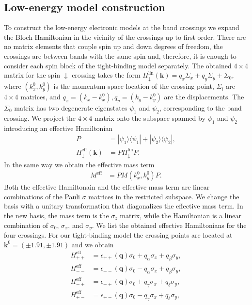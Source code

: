 \documentclass[aps,preprintnumbers,amsmath,amssymb]{revtex4-2}
\begin{document}
\subsection{Low-energy model construction}\label{appendix_lowEn}
To construct the low-energy electronic models at the band crossings we expand the Bloch Hamiltonian in the vicinity of the crossings up to first order. 
There are no matrix elements that couple spin up and down degrees of freedom, the crossings are between bands with the same spin and, therefore, it is enough to consider each spin block of the tight-binding model separately. The obtained $4 \times 4$ matrix for the spin $\downarrow$ crossing takes the form $H_{\downarrow}^{\text{lin}}(\mathbf{k}) = q_x \Sigma_x+q_y\Sigma_y +\Sigma_0$, where $(k_x^0, k_y^0)$ is the momentum-space location of the crossing point, $ \Sigma_i$ are $4 \times 4$ matrices, and $q_x = (k_x-k_{x}^0), q_y = (k_y-k_{y}^0)$ are the displacements. The $\Sigma_0$ matrix has two degenerate eigenstates $\psi_1$ and $\psi_2$, corresponding to the band crossing. We project the $4 \times 4$ matrix onto the subspace spanned by $\psi_1$ and $\psi_2$ introducing an effective Hamiltonian
\begin{align}
    P &= |\psi_1\rangle\langle\psi_1|+|\psi_2\rangle\langle\psi_2|,\\
    H_{\downarrow}^{\text{eff}}(\mathbf{k}) &= PH_{\downarrow}^{\text{lin}}P.
\end{align}
In the same way we obtain the effective mass term
\begin{align}
    M^{\text{eff}} &= PM(k_x^0,k_y^0)P.
\end{align}
Both the effective Hamiltonain and the effective mass term are linear combinations of the Pauli $\sigma$ matrices in the restricted subspace. We change the basis with a unitary transformation that diagonalizes the effective mass term. In the new basis, the mass term is the $\sigma_z$ matrix, while the Hamiltonian is a linear combination of $\sigma_0$, $\sigma_x$, and $\sigma_y$. We list the obtained effective Hamiltonians for the four crossings. For our tight-binding model the crossing points are located at $\mathbf{k}^0 = (\pm1.91, \pm1.91)$ and we obtain
\begin{subequations} \label{eq_low_ene_eff_hams}
\begin{align}
    H_{++}^{\text{eff}}&=\epsilon_{++}(\mathbf{q}) \sigma_0 + q_{\alpha}\sigma_x +q_{\beta}\sigma_y,\\
    H_{--}^{\text{eff}}&=\epsilon_{--}(\mathbf{q}) \sigma_0 -q_{\alpha}\sigma_x +q_{\beta}\sigma_y,\\
     H_{-+}^{\text{eff}}&=\epsilon_{-+}(\mathbf{q}) \sigma_0 + q_{\gamma}\sigma_x +q_{\delta}\sigma_y,\\
    H_{+-}^{\text{eff}}&=\epsilon_{+-}(\mathbf{q}) \sigma_0 -q_{\gamma}\sigma_x +q_{\delta}\sigma_y,
\end{align}
\end{subequations}
\end{document}
